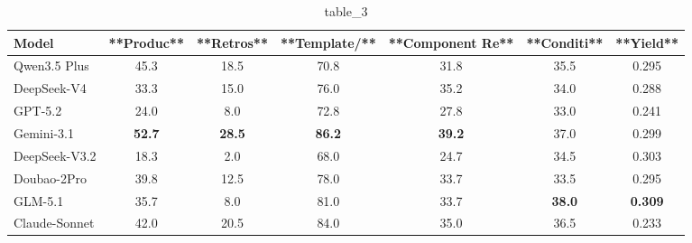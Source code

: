 \begin{table}[t]
\centering
\caption{table\_3}
\label{tab:2606.03660}
\begin{tabular}{lcccccc}
\toprule
Model & **Produc** & **Retros** & **Template/** & **Component Re** & **Conditi** & **Yield** \\
\midrule
Qwen3.5 Plus & 45.3 & 18.5 & 70.8 & 31.8 & 35.5 & 0.295 \\
DeepSeek-V4 & 33.3 & 15.0 & 76.0 & 35.2 & 34.0 & 0.288 \\
GPT-5.2 & 24.0 & 8.0 & 72.8 & 27.8 & 33.0 & 0.241 \\
Gemini-3.1 & \textbf{52.7} & \textbf{28.5} & \textbf{86.2} & \textbf{39.2} & 37.0 & 0.299 \\
DeepSeek-V3.2 & 18.3 & 2.0 & 68.0 & 24.7 & 34.5 & 0.303 \\
Doubao-2Pro & 39.8 & 12.5 & 78.0 & 33.7 & 33.5 & 0.295 \\
GLM-5.1 & 35.7 & 8.0 & 81.0 & 33.7 & \textbf{38.0} & \textbf{0.309} \\
Claude-Sonnet & 42.0 & 20.5 & 84.0 & 35.0 & 36.5 & 0.233 \\
\bottomrule
\end{tabular}
\end{table}
